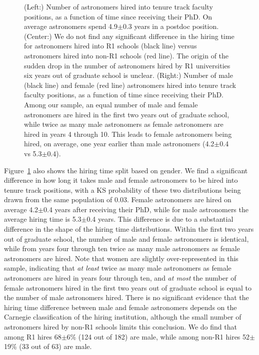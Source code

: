 \documentclass[modern]{aastex62}
\begin{document}
\begin{figure}[!htb]
\caption{(Left:) Number of astronomers hired into tenure track faculty positions, as a function of time since receiving their PhD. On average astronomers spend 4.9$\pm$0.3 years in a postdoc position. (Center:) We do not find any significant difference in the hiring time for astronomers hired into R1 schools (black line) versus astronomers hired into non-R1 schools (red line). The origin of the sudden drop in the number of astronomers hired by R1 universities six years out of graduate school is unclear. (Right:) Number of male (black line) and female (red line) astronomers hired into tenure track faculty positions, as a function of time since receiving their PhD. Among our sample, an equal number of male and female astronomers are hired in the first two years out of graduate school, while twice as many male astronomers as female astronomers are hired in years 4 through 10. This leads to female astronomers being hired, on average, one year earlier than male astronomers (4.2$\pm$0.4 vs 5.3$\pm$0.4).\label{hiring_time}}
\end{figure}

Figure~\ref{hiring_time} also shows the hiring time split based on gender. We find a significant difference in how long it takes male and female astronomers to be hired into tenure track positions, with a KS probability of these two distributions being drawn from the same population of 0.03. Female astronomers are hired on average 4.2$\pm$0.4 years after receiving their PhD, while for male astronomers the average hiring time is 5.3$\pm$0.4 years. This difference is due to a substantial difference in the shape of the hiring time distributions. Within the first two years out of graduate school, the number of male and female astronomers is identical, while from years four through ten twice as many male astronomers as female astronomers are hired. Note that women are slightly over-represented in this sample, indicating that {\it at least} twice as many male astronomers as female astronomers are hired in years four through ten, and {\it at most} the number of female astronomers hired in the first two years out of graduate school is equal to the number of male astronomers hired. There is no significant evidence that the hiring time difference between male and female astronomers depends on the Carnegie classification of the hiring institution, although the small number of astronomers hired by non-R1 schools limits this conclusion. We do find that among R1 hires 68$\pm$6\% (124 out of 182) are male, while among non-R1 hires 52$\pm$19\% (33 out of 63) are male.
\end{document}
